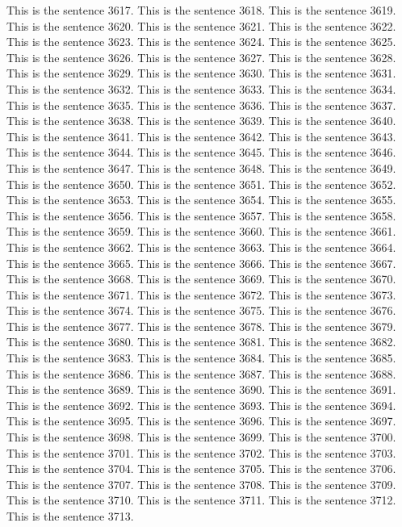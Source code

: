 \documentclass{article}
\begin{document}
This is the sentence 3617.
This is the sentence 3618.
This is the sentence 3619.
This is the sentence 3620.
This is the sentence 3621.
This is the sentence 3622.
This is the sentence 3623.
This is the sentence 3624.
This is the sentence 3625.
This is the sentence 3626.
This is the sentence 3627.
This is the sentence 3628.
This is the sentence 3629.
This is the sentence 3630.
This is the sentence 3631.
This is the sentence 3632.
This is the sentence 3633.
This is the sentence 3634.
This is the sentence 3635.
This is the sentence 3636.
This is the sentence 3637.
This is the sentence 3638.
This is the sentence 3639.
This is the sentence 3640.
This is the sentence 3641.
This is the sentence 3642.
This is the sentence 3643.
This is the sentence 3644.
This is the sentence 3645.
This is the sentence 3646.
This is the sentence 3647.
This is the sentence 3648.
This is the sentence 3649.
This is the sentence 3650.
This is the sentence 3651.
This is the sentence 3652.
This is the sentence 3653.
This is the sentence 3654.
This is the sentence 3655.
This is the sentence 3656.
This is the sentence 3657.
This is the sentence 3658.
This is the sentence 3659.
This is the sentence 3660.
This is the sentence 3661.
This is the sentence 3662.
This is the sentence 3663.
This is the sentence 3664.
This is the sentence 3665.
This is the sentence 3666.
This is the sentence 3667.
This is the sentence 3668.
This is the sentence 3669.
This is the sentence 3670.
This is the sentence 3671.
This is the sentence 3672.
This is the sentence 3673.
This is the sentence 3674.
This is the sentence 3675.
This is the sentence 3676.
This is the sentence 3677.
This is the sentence 3678.
This is the sentence 3679.
This is the sentence 3680.
This is the sentence 3681.
This is the sentence 3682.
This is the sentence 3683.
This is the sentence 3684.
This is the sentence 3685.
This is the sentence 3686.
This is the sentence 3687.
This is the sentence 3688.
This is the sentence 3689.
This is the sentence 3690.
This is the sentence 3691.
This is the sentence 3692.
This is the sentence 3693.
This is the sentence 3694.
This is the sentence 3695.
This is the sentence 3696.
This is the sentence 3697.
This is the sentence 3698.
This is the sentence 3699.
This is the sentence 3700.
This is the sentence 3701.
This is the sentence 3702.
This is the sentence 3703.
This is the sentence 3704.
This is the sentence 3705.
This is the sentence 3706.
This is the sentence 3707.
This is the sentence 3708.
This is the sentence 3709.
This is the sentence 3710.
This is the sentence 3711.
This is the sentence 3712.
This is the sentence 3713.
\end{document}
